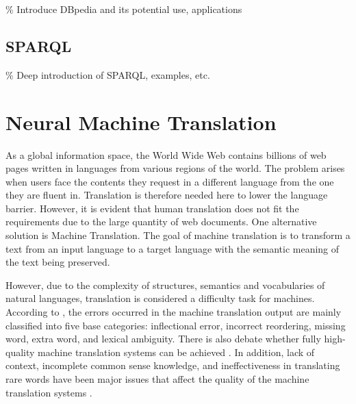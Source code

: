\% Introduce DBpedia and its potential use, applications

\subsection{SPARQL} \label{subsection:sparql}
\% Deep introduction of SPARQL, examples, etc.


\section{Neural Machine Translation} \label{section:neural machine translation}
As a global information space, the World Wide Web contains billions of web pages written in languages from various regions of the world. The problem arises when users face the contents they request in a different language from the one they are fluent in. Translation is therefore needed here to lower the language barrier. However, it is evident that human translation does not fit the requirements due to the large quantity of web documents. One alternative solution is Machine Translation. The goal of machine translation is to transform a text from an input language to a target language with the semantic meaning of the text being preserved.

However, due to the complexity of structures, semantics and vocabularies of natural languages, translation is considered a difficulty task for machines. According to \cite{Popovic2012}, the errors occurred in the machine translation output are mainly classified into five base categories: inflectional error, incorrect reordering, missing word, extra word, and lexical ambiguity. There is also debate whether fully high-quality machine translation systems can be achieved \cite{bar1964language}. In addition, lack of context, incomplete common sense knowledge, and ineffectiveness in translating rare words have been major issues that affect the quality of the machine translation systems \cite{okpor2014machine} \cite{Wu2016}.

